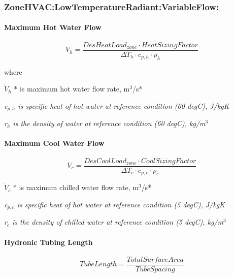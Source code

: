 \subsubsection{ZoneHVAC:LowTemperatureRadiant:VariableFlow:}\label{zonehvaclowtemperatureradiantvariableflow}

\paragraph{Maximum Hot Water Flow}\label{maximum-hot-water-flow-1}

\begin{equation}
{\dot V_h} = \frac{{DesHeatLoa{d_{zone}} \cdot HeatSizingFactor}}{{\Delta {T_h} \cdot {c_{p,h}} \cdot {\rho_h}}}
\end{equation}

where

\({\dot V_h}\) * is maximum hot water flow rate, m\(^{3}\)/s*

\emph{c\(_{p,h}\) is specific heat of hot water at reference condition (60 degC), J/kgK}

\emph{r\(_{h}\) is the density of water at reference condition (60 degC), kg/m\(^{3}\)}

\paragraph{Maximum Cool Water Flow}\label{maximum-cool-water-flow}

\begin{equation}
{\dot V_c} = \frac{{DesCoolLoa{d_{zone}} \cdot CoolSizingFactor}}{{\Delta {T_c} \cdot {c_{p,c}} \cdot {\rho_c}}}
\end{equation}

\({\dot V_c}\) * is maximum chilled water flow rate, m\(^{3}\)/s*

\emph{c\(_{p,c}\) is specific heat of hot water at reference condition (5 degC), J/kgK}

\emph{r\(_{c}\) is the density of chilled water at reference condition (5 degC), kg/m\(^{3}\)}

\paragraph{Hydronic Tubing Length}\label{hydronic-tubing-length}

\begin{equation}
TubeLength = \frac{{TotalSurfaceArea}}{{TubeSpacing}}
\end{equation}

